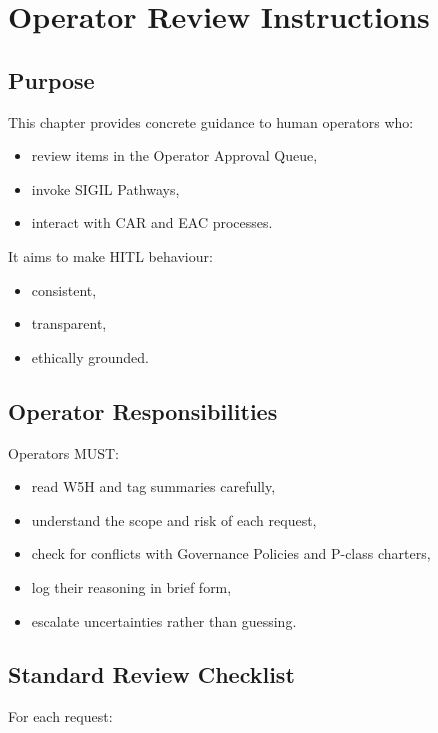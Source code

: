 \chapter{Operator Review Instructions}
\label{chap:Review_Instructions}

\section{Purpose}

This chapter provides concrete guidance to human operators who:
\begin{itemize}
    \item review items in the Operator Approval Queue,
    \item invoke SIGIL Pathways,
    \item interact with CAR and EAC processes.
\end{itemize}

It aims to make HITL behaviour:
\begin{itemize}
    \item consistent,
    \item transparent,
    \item ethically grounded.
\end{itemize}

\section{Operator Responsibilities}

Operators MUST:

\begin{itemize}
    \item read W5H and tag summaries carefully,
    \item understand the scope and risk of each request,
    \item check for conflicts with Governance Policies and P-class charters,
    \item log their reasoning in brief form,
    \item escalate uncertainties rather than guessing.
\end{itemize}

\section{Standard Review Checklist}

For each request:

